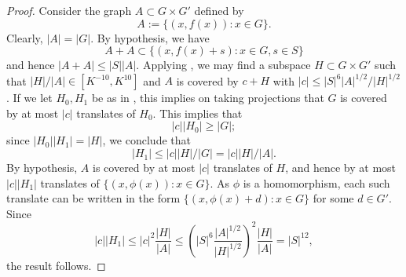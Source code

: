 \begin{proof}\leanok
Consider the graph $A \subset G \times G'$ defined by
$$ A := \{ (x,f(x)): x \in G \}.$$
Clearly, $|A| = |G|$.  By hypothesis, we have
$$ A+A \subset \{ (x,f(x)+s): x \in G, s \in S\}$$
and hence $|A+A| \leq |S| |A|$.  Applying , we may
find a subspace $H \subset G \times G'$ such that $|H|/ |A| \in [K^{-10},
K^{10}]$ and $A$ is covered by $c + H$ with $|c| \le |S|^6|A|^{1/2} /
|H|^{1/2}$. If we let $H_0, H_1$ be as in , this implies
on taking projections that $G$ is covered by at most $|c|$ translates of
$H_0$. This implies that
$$ |c| |H_0| \geq |G|;$$
since $|H_0| |H_1| = |H|$, we conclude that
$$ |H_1| \leq |c| |H|/|G| = |c| |H|/|A|.$$
By hypothesis, $A$ is covered by at most $|c|$ translates of $H$, and hence
by at most $|c| |H_1|$ translates of $\{ (x,\phi(x)): x \in G \}$. As $\phi$
is a homomorphism, each such translate can be written in the form $\{
(x,\phi(x)+d): x \in G \}$ for some $d \in G'$. Since
$$
|c| |H_1| \le |c|^2 \frac{|H|}{|A|} \le \left(|S|^6 \frac{|A|^{1/2}}{|H|^{1/2}}\right)^2 \frac{|H|}{|A|}
= |S|^{12},
$$
the result follows.
\end{proof}
